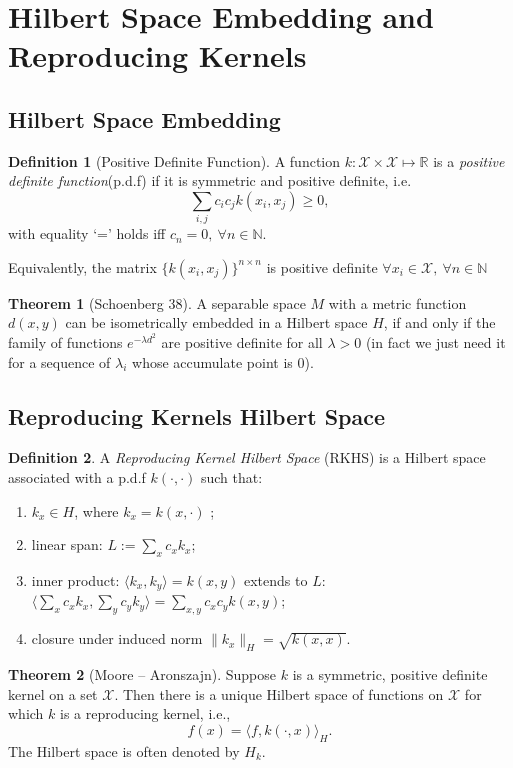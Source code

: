 \documentclass[twoside]{article}
\theoremstyle{definition}
\newtheorem{thm}{Theorem}[section]
\theoremstyle{definition}
\newtheorem*{defn}{Definition}
\theoremstyle{remark}
\begin{document}
\section{Hilbert Space Embedding and Reproducing Kernels}
\subsection{Hilbert Space Embedding}
\begin{defn}[Positive Definite Function]
A function $k: \mathcal{X}\times \mathcal{X} \mapsto \mathbb{R} $ is a \emph{positive definite function}(p.d.f) if it is symmetric and positive definite, i.e. 
$$\sum\limits_{i,j} c_ic_jk(x_i,x_j)\ge 0, $$ 
with equality `=' holds iff $c_n=0, \ \forall n \in \mathbb{N}$. 

Equivalently, the matrix $\{k(x_i,x_j)\}^{n\times n}$ is positive definite $\forall x_i\in \mathcal{X},\ \forall n\in \mathbb{N}$
\end{defn}
\begin{thm}[Schoenberg 38]
A separable space $M$ with a metric function $d(x,y)$ can be isometrically embedded in a Hilbert space $H$, if and only if the family of functions $e^{-\lambda d^2}$ are positive definite for all $\lambda>0$ (in fact we just need it for a sequence of $\lambda_i$ whose accumulate point is $0$).  
\end{thm}

\subsection{Reproducing Kernels Hilbert Space} 

\begin{defn}
A \emph{Reproducing Kernel Hilbert Space} (RKHS) is a Hilbert space associated with a p.d.f $k(\cdot,\cdot)$ such that:
\begin{enumerate}
  \item $k_x \in H $, where $k_x = k(x,\cdot)$ ;
  \item linear span: $L:= {\sum\limits_x c_xk_x}$;
  \item inner product: $\langle k_x,k_y \rangle = k(x,y)$
  extends to $L$: $\langle \sum\limits_x c_xk_x,\sum\limits_y c_yk_y\rangle = \sum\limits_{x,y} c_xc_yk(x,y)$;
  \item closure under induced norm $\|k_x\|_H = \sqrt{k(x,x)}$.
\end{enumerate}
\end{defn}
\begin{thm}[Moore – Aronszajn]
Suppose $k$ is a symmetric, positive definite kernel on a set $\mathcal{X}$. Then there is a unique Hilbert space of functions on $\mathcal{X}$ for which $k$ is a reproducing kernel, i.e., 
$$f(x) = \langle f,k(\cdot,x)\rangle _H .$$ 
The Hilbert space is often denoted by $H_k$.
\end{thm}
\end{document}
